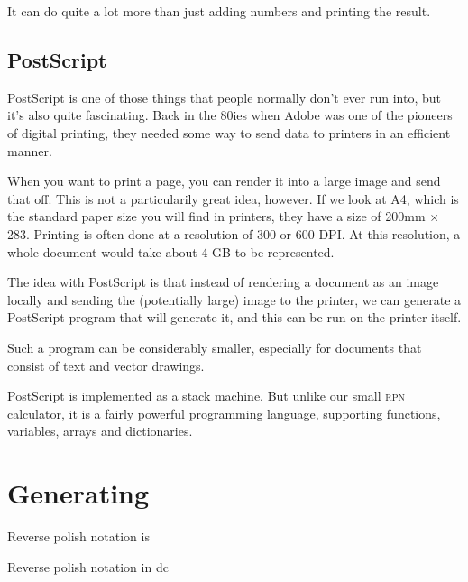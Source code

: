 \documentclass[a4paper,twocolumn]{article}
\begin{document}
It can do quite a lot more than just adding numbers and printing the result. 


\subsection{PostScript}

PostScript is one of those things that people normally don't ever run into, but it's also quite fascinating. Back in the 80ies when Adobe was one of the pioneers of digital printing, they needed some way to send data to printers in an efficient manner.

When you want to print a page, you can render it into a large image and send that off. This is not a particularily great idea, however. If we look at A4, which is the standard paper size you will find in printers, they have a size of 200mm $\times$ 283. Printing is often done at a resolution of 300 or 600 DPI. At this resolution, a whole document would take about 4 GB to be represented.

The idea with PostScript is that instead of rendering a document as an image locally and sending the (potentially large) image to the printer, we can generate a PostScript program that will generate it, and this can be run on the printer itself.

Such a program can be considerably smaller, especially for documents that consist of text and vector drawings.

PostScript is implemented as a stack machine. But unlike our small \textsc{rpn} calculator, it is a fairly powerful programming language, supporting functions, variables, arrays and dictionaries.

\section{Generating}

Reverse polish notation is


Reverse polish notation in dc
\end{document}

